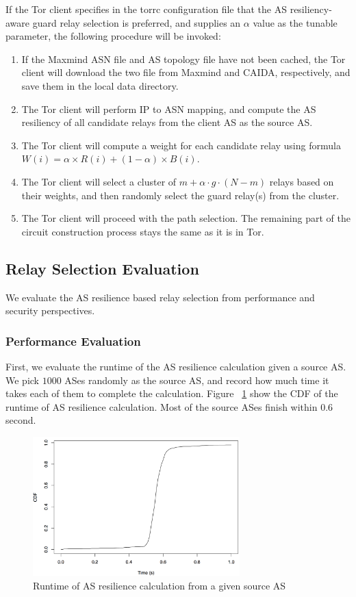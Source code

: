 If the Tor client specifies in the torrc configuration file that the AS resiliency-aware guard relay selection is preferred, and supplies an $\alpha$ value as the tunable parameter, the following procedure will be invoked:

\begin{enumerate}
\item If the Maxmind ASN file and AS topology file have not been cached, the Tor client will download the two file from Maxmind and CAIDA, respectively, and save them in the local data directory. 
\item The Tor client will perform IP to ASN mapping, and compute the AS resiliency of all candidate relays from the client AS as the source AS. 
\item The Tor client will compute a weight for each candidate relay using formula $W(i) = \alpha \times R(i) + (1 - \alpha) \times B(i)$. 
\item The Tor client will select a cluster of $m + \alpha \cdot g \cdot (N - m)$ relays based on their weights, and then randomly select the guard relay(s) from the cluster. 
\item The Tor client will proceed with the path selection. The remaining part of the circuit construction process stays the same as it is in Tor. 
\end{enumerate}

\subsection{Relay Selection Evaluation}

We evaluate the AS resilience based relay selection from performance and security perspectives. 

\subsubsection{Performance Evaluation}

First, we evaluate the runtime of the AS resilience calculation given a source AS. We pick $1000$ ASes randomly as the source AS, and record how much time it takes each of them to complete the calculation. Figure ~\ref{fig_ascal} show the CDF of the runtime of AS resilience calculation. Most of the source ASes finish within $0.6$ second. 

\begin{figure}[ht!]
\centering
\includegraphics[width=80mm]{figure/runtime}
\caption{Runtime of AS resilience calculation from a given source AS \label{fig_ascal}}
\end{figure}

